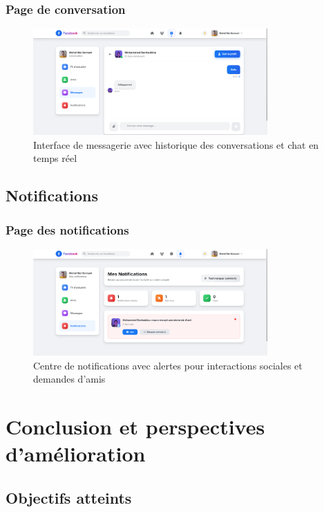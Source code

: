 \documentclass[12pt,a4paper]{article}
\begin{document}
\subsubsection{Page de conversation}
\begin{figure}[H]
    \centering
    \includegraphics[width=0.8\textwidth]{screenshots/conversation.png}
    \caption{Interface de messagerie avec historique des conversations et chat en temps r\'eel}
    \label{fig:conversation}
\end{figure}

\subsection{Notifications}

\subsubsection{Page des notifications}
\begin{figure}[H]
    \centering
    \includegraphics[width=0.8\textwidth]{screenshots/notifications.png}
    \caption{Centre de notifications avec alertes pour interactions sociales et demandes d'amis}
    \label{fig:notifications}
\end{figure}

\section{Conclusion et perspectives d'am\'elioration}

\subsection{Objectifs atteints}
\end{document}
